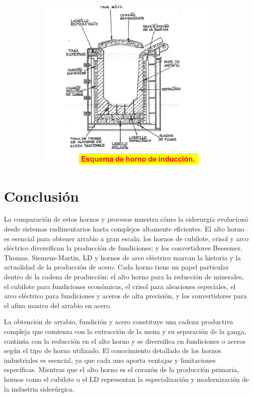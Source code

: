 \documentclass[12pt,a4paper]{article}
\begin{document}
\begin{figure}[h!]
\begin{subfigure}{0.45\textwidth}
        \includegraphics[width=\textwidth]{Inagenes para latex/induccion 2.png}
        \label{induccion}
    \end{subfigure}
 \end{figure}

\section{Conclusión}
La comparación de estos hornos y procesos muestra cómo la siderurgia evolucionó desde sistemas rudimentarios hasta complejos altamente eficientes. El alto horno es esencial para obtener arrabio a gran escala; los hornos de cubilote, crisol y arco eléctrico diversifican la producción de fundiciones; y los convertidores Bessemer, Thomas, Siemens-Martin, LD y hornos de arco eléctrico marcan la historia y la actualidad de la producción de acero. Cada horno tiene un papel particular dentro de la cadena de producción: el alto horno para la reducción de minerales, el cubilote para fundiciones económicas, el crisol para aleaciones especiales, el arco eléctrico para fundiciones y aceros de alta precisión, y los convertidores para el afino masivo del arrabio en acero.

La obtención de arrabio, fundición y acero constituye una cadena productiva compleja que comienza con la extracción de la mena y su separación de la ganga, continúa con la reducción en el alto horno y se diversifica en fundiciones o aceros según el tipo de horno utilizado. El conocimiento detallado de los hornos industriales es esencial, ya que cada uno aporta ventajas y limitaciones específicas. Mientras que el alto horno es el corazón de la producción primaria, hornos como el cubilote o el LD representan la especialización y modernización de la industria siderúrgica.
\end{document}
